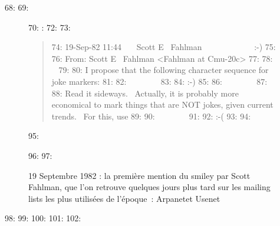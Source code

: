 68: 
69: \begin{figure}[h]
70:     :     
72: 
73:     \begin{quote}
74:     19-Sep-82 11:44~~~ Scott E~ Fahlman~~~~~~~~~~~~ :-)
75: 
76:     From: Scott E~ Fahlman {\textless}Fahlman at Cmu-20c{\textgreater}
77: 
78:     ~
79:     
80:     I propose that the following character sequence for joke markers:
81: 
82:     ~~~~~~~ 
83: 
84:     :-)
85: 
86:     ~~~~~~~ 
87:     
88:     Read it sideways.~ Actually, it is probably more economical to mark things that are NOT jokes, given current trends.~ For this, use
89: 
90:     ~~~~~~~ 
91: 
92:     :-(
93: 
94:     \end{quote}
95:     \caption[la première mention du smiley par Scott Fahlman]{19 Septembre 1982 : la première mention du smiley par Scott Fahlman\protect\footnotemark, que l’on retrouve quelques jours plus tard sur les mailing lists les plus utilisées de l’époque : Arpanet\protect\footnotemark  et Usenet \protect\footnotemark}
96:     \label{fig:smiley-story}
97: \end{figure}
98: 
99: 
100: 
101: 
102: 
